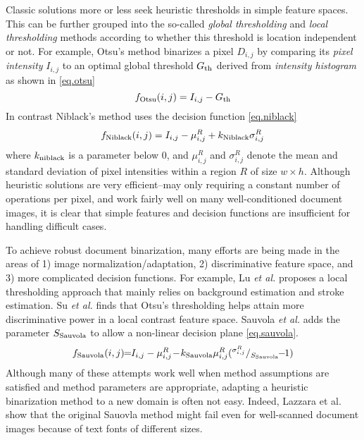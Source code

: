 \documentclass[onecolumn,11pt,draftcls,journal]{IEEEtran}
\def\etal{{\textit{et al.}}}
\begin{document}
Classic solutions more or less seek heuristic thresholds in simple feature spaces. 
This can be further grouped into the so-called {\textit{global thresholding}} and {\textit{local thresholding}} methods \cite{Combined2014} according to whether this threshold is location independent or not.
For example, Otsu's method \cite{Otsu1975} binarizes a pixel $D_{i,j}$ by comparing its \textit{pixel intensity} $I_{i,j}$ to an optimal global threshold $G_{\rm{th}}$ derived from  \textit{intensity histogram} \cite{Otsu1975} as shown in \eqref{eq.otsu}
\begin{equation}
f_{\rm{Otsu}}(i,j)=I_{i,j} - G_{\rm{th}}
\label{eq.otsu}
\end{equation}
In contrast Niblack's method \cite{Niblack1986} uses the decision function \eqref{eq.niblack}
\begin{equation}
f_{\rm{Niblack}}(i,j)= I_{i,j}-\mu^R_{i,j} +k_{\rm{Niblack}}\sigma^R_{i,j} 
\label{eq.niblack}
\end{equation}
where $k_{\rm{niblack}}$ is a parameter below 0, and $\mu^R_{i,j}$ and $\sigma^R_{i,j}$ denote the mean and standard deviation of pixel intensities within a region $R$ of size $w\!\!\times\!\!h$. 
Although heuristic solutions are very efficient--may only requiring a constant number of operations per pixel, and work fairly well on many well-conditioned document images, it is clear that simple features and decision functions are insufficient for handling difficult cases. 

To achieve robust document binarization, many efforts are being made in the areas of 1) image normalization/adaptation, 2) discriminative feature space, and 3) more complicated decision functions. For example, Lu \etal \cite{Lu2010} proposes a local thresholding approach that mainly relies on background estimation and stroke estimation. Su \etal \cite{Su2009,Su2013} finds that Otsu's thresholding helps attain more discriminative power in a local contrast feature space. Sauvola \etal \cite{Sauvola1997,Sauvola2000} adds the parameter $S_{\rm{Sauvola}}$ to allow a non-linear decision plane \eqref{eq.sauvola}.
\begin{equation}
f_{\rm{Sauvola}}(i,j)\!\!=\!\! I_{i,j}-\mu^R_{i,j}\!-\!k_{\rm{Sauvola}}\mu^R_{i,j}(^{\sigma^R_{i,j}}/_{S_{\rm{Sauvola}}} \!\!-\!\!1 )  
\label{eq.sauvola}
\end{equation}
Although many of these attempts work well when method assumptions are satisfied and method parameters are appropriate, adapting a heuristic binarization method to a new domain is often not easy. Indeed, Lazzara et al. \cite{Sauvola2014} show that the original Sauovla method might fail even for well-scanned document images because of text fonts of different sizes. 
\end{document}
